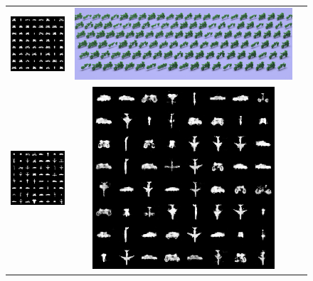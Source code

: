 \begin{figure}
\begin{center}
\begin{tabular}{ccc}
    \includegraphics[height=\fh]{fig/bike/300.png} & 
    \includegraphics[height=\fh]{fig/bike/output.png} \\
    \includegraphics[height=\fh]{fig/mix/samples.png} & 
    \includegraphics[height=\fh]{fig/mix/0.png} & 

\end{tabular}
\end{center}
\end{figure}
